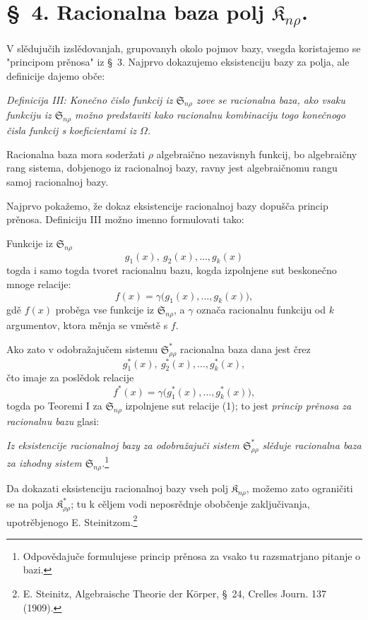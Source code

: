 \documentclass[11pt]{article}
\providecommand{\Kfield}{\mathfrak{K}}
\providecommand{\Ssys}{\mathfrak{S}}
\begin{document}
\section*{\S\ 4. Racionalna baza polj $\Kfield_{n\rho}$.}

V slědujučih izslědovanjah, grupovanyh okolo pojmov bazy, vsegda koristajemo se "principom prěnosa" iz \S\ 3. Najprvo dokazujemo eksistenciju bazy za polja, ale definicije dajemo obče:

{\itshape Definicija III: Konečno čislo funkcij iz $\Ssys_{n\rho}$ zove se racionalna baza, ako vsaku funkciju iz $\Ssys_{n\rho}$ možno predstaviti kako racionalnu kombinaciju togo konečnogo čisla funkcij s koeficientami iz $\Omega$.}

Racionalna baza mora soderžati $\rho$ algebraično nezavisnyh funkcij, bo algebraičny rang sistema, dobjenogo iz racionalnoj bazy, ravny jest algebraičnomu rangu samoj racionalnoj bazy.

Najprvo pokažemo, že dokaz eksistencije racionalnoj bazy dopušča princip prěnosa. Definiciju III možno imenno formulovati tako:

Funkcije iz $\Ssys_{n\rho}$
\[
  g_1(x),\ g_2(x),\ldots, g_k(x)
\]
togda i samo togda tvoret racionalnu bazu, kogda izpolnjene sut beskonečno mnoge relacije:
\begin{equation}
  f(x)=\gamma\bigl(g_1(x),\ldots,g_k(x)\bigr),
\tag{1}
\end{equation}
gdě $f(x)$ proběga vse funkcije iz $\Ssys_{n\rho}$, a $\gamma$ označa racionalnu funkciju od $k$ argumentov, ktora měnja se vměstě s $f$.

Ako zato v odobražajučem sistemu $\Ssys^*_{\rho\rho}$ racionalna baza dana jest črez
\[
  g_1^*(x),\ g_2^*(x),\ldots, g_k^*(x),
\]
čto imaje za poslědok relacije
\[
  f^*(x)=\gamma\bigl(g_1^*(x),\ldots,g_k^*(x)\bigr),
\]
togda po Teoremi I za $\Ssys_{n\rho}$ izpolnjene sut relacije (1); to jest {\itshape princip prěnosa za racionalnu bazu} glasi:

{\itshape Iz eksistencije racionalnoj bazy za odobražajuči sistem $\Ssys^*_{\rho\rho}$ slěduje racionalna baza za izhodny sistem $\Ssys_{n\rho}$.}\footnote{Odpovědajuče formulujese princip prěnosa za vsako tu razsmatrjano pitanje o bazi.}

Da dokazati eksistenciju racionalnoj bazy vseh polj $\Kfield_{n\rho}$, možemo zato ograničiti se na polja $\Kfield^*_{\rho\rho}$; tu k cěljem vodi neposrědnje obobčenje zaključivanja, upotrěbjenogo E. Steinitzom.\footnote{E. Steinitz, Algebraische Theorie der Körper, \S\ 24, Crelles Journ. 137 (1909).}
\end{document}
